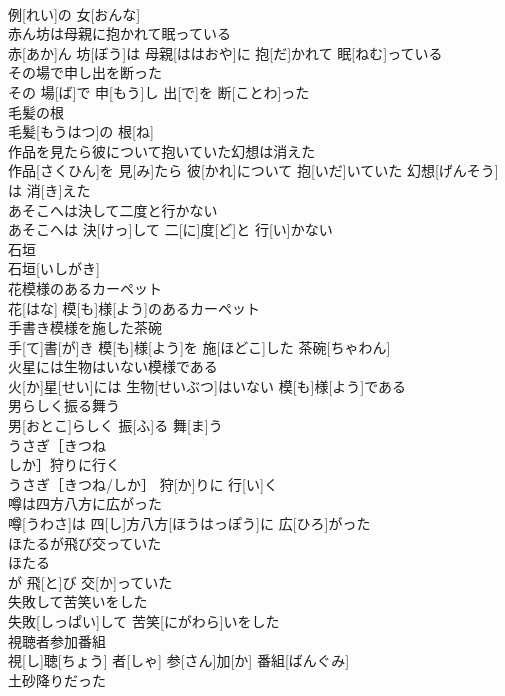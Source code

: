 \documentclass[8pt]{extreport}
\begin{document}
\begin{CJK}{UTF8}{min}
\\	例[れい]の 女[おんな]
\\	赤ん坊は母親に抱かれて眠っている	
\\	赤[あか]ん 坊[ぼう]は 母親[ははおや]に 抱[だ]かれて 眠[ねむ]っている
\\	その場で申し出を断った	
\\	その 場[ば]で 申[もう]し 出[で]を 断[ことわ]った
\\	毛髪の根	
\\	毛髪[もうはつ]の 根[ね]
\\	作品を見たら彼について抱いていた幻想は消えた	
\\	作品[さくひん]を 見[み]たら 彼[かれ]について 抱[いだ]いていた 幻想[げんそう]は 消[き]えた
\\	あそこへは決して二度と行かない	
\\	あそこへは 決[けっ]して 二[に]度[ど]と 行[い]かない
\\	石垣	
\\	石垣[いしがき]
\\	花模様のあるカーペット	
\\	花[はな] 模[も]様[よう]のあるカーペット
\\	手書き模様を施した茶碗	
\\	手[て]書[が]き 模[も]様[よう]を 施[ほどこ]した 茶碗[ちゃわん]
\\	火星には生物はいない模様である	
\\	火[か]星[せい]には 生物[せいぶつ]はいない 模[も]様[よう]である
\\	男らしく振る舞う	
\\	男[おとこ]らしく 振[ふ]る 舞[ま]う
\\	うさぎ［きつね 
\\	しか］狩りに行く	
\\	うさぎ［きつね/しか］ 狩[か]りに 行[い]く
\\	噂は四方八方に広がった	
\\	噂[うわさ]は 四[し]方八方[ほうはっぽう]に 広[ひろ]がった
\\	ほたるが飛び交っていた	
\\	ほたる 
\\	が 飛[と]び 交[か]っていた 
\\	失敗して苦笑いをした	
\\	失敗[しっぱい]して 苦笑[にがわら]いをした
\\	視聴者参加番組	
\\	視[し]聴[ちょう] 者[しゃ] 参[さん]加[か] 番組[ばんぐみ]
\\	土砂降りだった	

\end{CJK}
\end{document}
